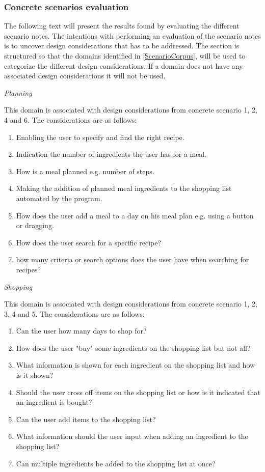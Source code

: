 \subsubsection{Concrete scenarios evaluation} 
The following text will present the results found by evaluating the different scenario notes. The intentions with performing an evaluation of the scenario notes is to uncover design considerations that has to be addressed. The section is structured so that the domains identified in \cref{ScenarioCorpus}, will be used to categorize the different design considerations. If a domain does not have any associated design considerations it will not be used.  

\emph{Planning}

This domain is associated with design considerations from concrete scenario 1, 2, 4 and 6. The considerations are as follows:

\begin{enumerate}
	\item Enabling the user to specify and find the right recipe.	
	\item Indication the number of ingredients the user has for a meal.
	\item How is a meal planned e.g. number of steps.
	\item Making the addition of planned meal ingredients to the shopping list automated by the program.
	\item How does the user add a meal to a day on his meal plan e.g. using a button or dragging.
	\item How does the user search for a specific recipe?
	\item how many criteria or search options does the user have when searching for recipes?
\end{enumerate}

\emph{Shopping}

This domain is associated with design considerations from concrete scenario 1, 2, 3, 4 and 5. The considerations are as follows:

\begin{enumerate}
	\item Can the user how many days to shop for?
	\item How does the user "buy" some ingredients on the shopping list but not all?
	\item What information is shown for each ingredient on the shopping list and how is it shown?
	\item Should the user cross off items on the shopping list or how is it indicated that an ingredient is bought?
	\item Can the user add items to the shopping list?
	\item What information should the user input when adding an ingredient to the shopping list?
	\item Can multiple ingredients be added to the shopping list at once?   
\end{enumerate}

